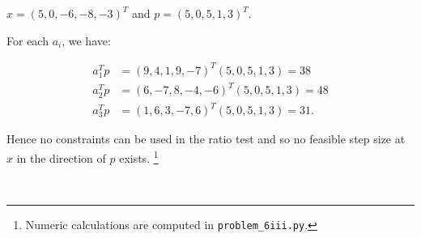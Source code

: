 $x = (5, 0 , -6, -8, -3)^T$ and $p = (5, 0, 5, 1, 3)^T.$

\begin{solution}
  For each $a_i$, we have:

  \begin{align*}
    a_1^T p &= (9, 4, 1, 9, -7)^T (5, 0, 5, 1, 3) = 38 \\
    a_2^T p &= (6, -7, 8, -4, -6)^T (5, 0, 5, 1, 3) = 48 \\
    a_3^T p &= (1, 6, 3, -7, 6)^T (5, 0, 5, 1, 3) = 31.
  \end{align*}

  Hence no constraints can be used in the ratio test and so no feasible step size at $x$ in the direction of $p$ exists.
  \footnote{
    Numeric calculations are computed in \texttt{problem\_6iii.py}.
  }

  \ \\
\end{solution}